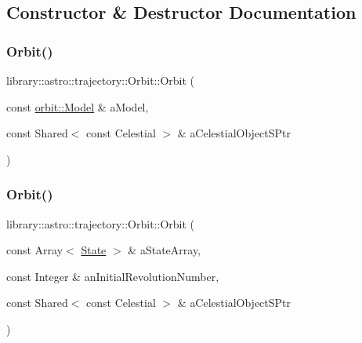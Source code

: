 \subsection{Constructor \& Destructor Documentation}
\mbox{\label{classlibrary_1_1astro_1_1trajectory_1_1_orbit_af2aec60afc1bbebd46991005cf04026e}} 
\subsubsection{\texorpdfstring{Orbit()}{Orbit()}\hspace{0.1cm}{\footnotesize\ttfamily [1/3]}}
{\footnotesize\ttfamily library\+::astro\+::trajectory\+::\+Orbit\+::\+Orbit (\begin{DoxyParamCaption}\item[{const \hyperlink{classlibrary_1_1astro_1_1trajectory_1_1orbit_1_1_model}{orbit\+::\+Model} \&}]{a\+Model,  }\item[{const Shared$<$ const Celestial $>$ \&}]{a\+Celestial\+Object\+S\+Ptr }\end{DoxyParamCaption})}

\mbox{\label{classlibrary_1_1astro_1_1trajectory_1_1_orbit_aea59cb4c5be4c8d4bcbac7256d28683d}} 
\subsubsection{\texorpdfstring{Orbit()}{Orbit()}\hspace{0.1cm}{\footnotesize\ttfamily [2/3]}}
{\footnotesize\ttfamily library\+::astro\+::trajectory\+::\+Orbit\+::\+Orbit (\begin{DoxyParamCaption}\item[{const Array$<$ \hyperlink{classlibrary_1_1astro_1_1trajectory_1_1_state}{State} $>$ \&}]{a\+State\+Array,  }\item[{const Integer \&}]{an\+Initial\+Revolution\+Number,  }\item[{const Shared$<$ const Celestial $>$ \&}]{a\+Celestial\+Object\+S\+Ptr }\end{DoxyParamCaption})}

